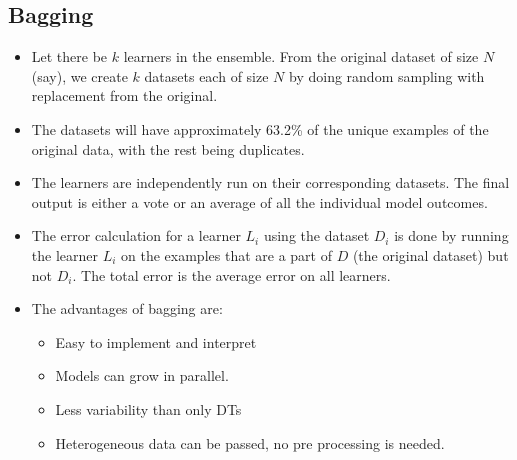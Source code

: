 \documentclass{article}
\theoremstyle{plain}
\theoremstyle{definition}
\begin{document}
\subsection{Bagging}
\begin{itemize}
    \item Let there be $k$ learners in the ensemble. From the original dataset of size $N$ (say),  we create $k$ datasets each of size $N$ by doing random sampling with replacement from the original. 
    
    \item The datasets will have approximately 63.2\% of the unique examples of the original data, with the rest being duplicates. 
    
    \item The learners are independently run on their corresponding datasets. The final output is either a vote or an average of all the individual model outcomes.
    
    \item The error calculation for a learner $L_i$ using the dataset $D_i$ is done by running the learner $L_i$ on the examples that are a part of $D$ (the original dataset) but not $D_i$. The total error is the average error on all learners. 
    
    \item The advantages of bagging are:
    \begin{itemize}
        \item Easy to implement and interpret 
        
        \item Models can grow in parallel. 
        
        \item Less variability than only DTs
        
        \item Heterogeneous data can be passed, no pre processing is needed. 
    \end{itemize}
\end{itemize}
\end{document}
